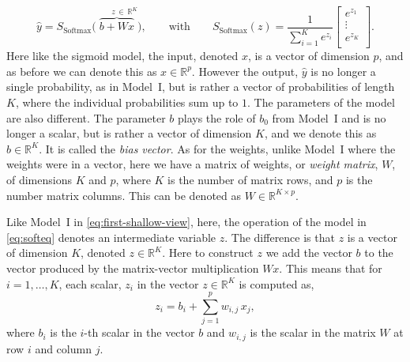 \documentclass[12pt]{article}
\begin{document}
%
\begin{equation}
\label{eq:softeq}
\hat{y}=S_{\text{Softmax}} \big(\overbrace{b+W  x}^{\quad \,\,\, \, \,\, z\, \in \, {\mathbb R}^K}\big),
%
\qquad
\text{with}
\qquad
%
S_{\textrm{Softmax}}(z) = \frac{1}{\sum_{i=1}^{K} e^{z_i}} 
\begin{bmatrix}
e^{z_1} \\
\vdots\\
e^{z_{K}}\\
\end{bmatrix}.
\end{equation}
%
Here like the sigmoid model, the input, denoted $x$, is a vector of dimension $p$, and as before we can denote this as  $x\in {\mathbb R}^p$. However the output, $\hat{y}$ is no longer a single probability, as in Model~I, but is rather a vector of probabilities of length $K$, where the individual probabilities sum up to $1$. The parameters of the model are also different. The parameter $b$ plays the role of $b_0$ from Model~I and is no longer a scalar, but is rather a vector of dimension $K$, and we denote this as $b\in {\mathbb R}^K$. It is called the {\em bias vector}. As for the weights, unlike Model~I where the weights were in a vector, here we have a matrix of weights, or {\em weight matrix}, $W$, of dimensions $K$ and $p$, where $K$ is the number of matrix rows, and $p$ is the number matrix columns. This can be denoted as $W\in {\mathbb R}^{K\times p}$.

Like Model~I in \eqref{eq:first-shallow-view}, here, the operation of the model in \eqref{eq:softeq} denotes an intermediate variable $z$. The difference is that $z$ is a vector of dimension $K$, denoted $z \in {\mathbb R}^K$. Here to construct $z$ we add the vector $b$ to the vector produced by the matrix-vector multiplication $W x$. 
This means that for $i=1,\dots,K$, each scalar, $z_i$ in the vector $z\in {\mathbb R}^K$ is computed as,
%
\begin{equation}
\label{eq:small-zk-log-mult}
z_i = b_i + \sum_{j=1}^p w_{i,j} \, x_j,
\end{equation}
%
where $b_i$ is the $i$-th scalar in the vector $b$ and $w_{i,j}$ is the scalar in the matrix $W$ at row $i$ and column $j$.
\end{document}
